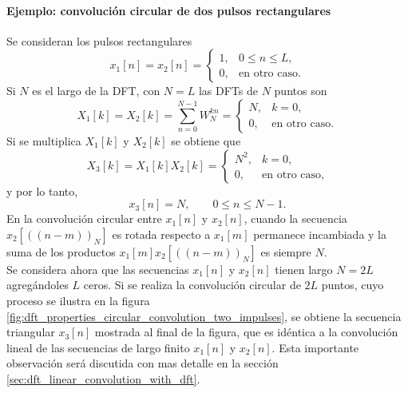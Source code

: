 \documentclass[a4paper]{report}
\begin{document}
\paragraph{Ejemplo: convolución circular de dos pulsos rectangulares} Se consideran los pulsos rectangulares
\[
 x_1[n]=x_2[n]=
 \left\{ 
 \begin{array}{ll}
  1, & 0\leq n\leq L,\\
  0, & \textrm{en otro caso.}
 \end{array}
 \right.
\]
Si \(N\) es el largo de la DFT, con \(N=L\) las DFTs de \(N\) puntos son
\[
 X_1[k]=X_2[k]=\sum_{n=0}^{N-1}W_N^{kn}=
 \left\{ 
 \begin{array}{ll}
  N, & k=0,\\
  0, & \textrm{en otro caso.}
 \end{array}
 \right.
\]
Si se multiplica \(X_1[k]\) y \(X_2[k]\) se obtiene que 
\[
 X_3[k]=X_1[k]X_2[k]=
 \left\{ 
 \begin{array}{ll}
  N^2, & k=0,\\
  0, & \textrm{en otro caso,}
 \end{array}
 \right.
\]
y por lo tanto,
\[
 x_3[n]=N,\qquad 0\leq n\leq N-1.
\]
En la convolución circular entre \(x_1[n]\) y \(x_2[n]\), cuando la secuencia \(x_2[((n-m))_N]\) es rotada respecto a \(x_1[m]\) permanece incambiada y la suma de los productos \(x_1[m]x_2[((n-m))_N]\) es siempre \(N\).\\
Se considera ahora que las secuencias \(x_1[n]\) y \(x_2[n]\) tienen largo \(N=2L\) agregándoles \(L\) ceros. Si se realiza la convolución circular de \(2L\) puntos, cuyo proceso se ilustra en la figura \ref{fig:dft_properties_circular_convolution_two_impulses}, se obtiene la secuencia triangular \(x_3[n]\) mostrada al final de la figura, que es idéntica a la convolución lineal de las secuencias de largo finito \(x_1[n]\) y \(x_2[n]\). Esta importante observación será discutida con mas detalle en la sección \ref{sec:dft_linear_convolution_with_dft}.
\end{document}
